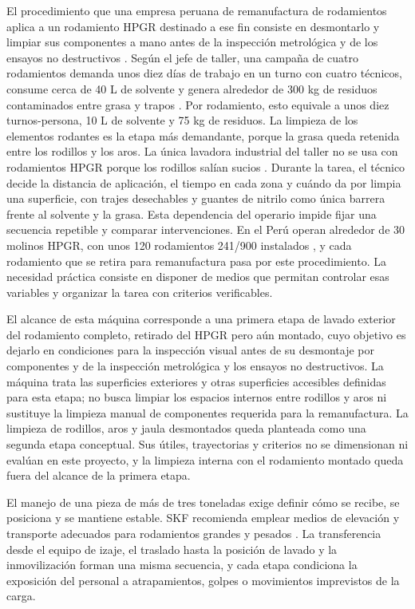 El procedimiento que una empresa peruana de remanufactura de rodamientos aplica a un rodamiento HPGR destinado a ese fin consiste en desmontarlo y limpiar sus componentes a mano antes de la inspección metrológica y de los ensayos no destructivos \cite{taller_jefe_2026}. Según el jefe de taller, una campaña de cuatro rodamientos demanda unos diez días de trabajo en un turno con cuatro técnicos, consume cerca de 40 L de solvente y genera alrededor de 300 kg de residuos contaminados entre grasa y trapos \cite{taller_jefe_2026}. Por rodamiento, esto equivale a unos diez turnos-persona, 10 L de solvente y 75 kg de residuos. La limpieza de los elementos rodantes es la etapa más demandante, porque la grasa queda retenida entre los rodillos y los aros. La única lavadora industrial del taller no se usa con rodamientos HPGR porque los rodillos salían sucios \cite{taller_jefe_2026}. Durante la tarea, el técnico decide la distancia de aplicación, el tiempo en cada zona y cuándo da por limpia una superficie, con trajes desechables y guantes de nitrilo como única barrera frente al solvente y la grasa. Esta dependencia del operario impide fijar una secuencia repetible y comparar intervenciones. En el Perú operan alrededor de 30 molinos HPGR, con unos 120 rodamientos 241/900 instalados \cite{taller_ingeniero_2026}, y cada rodamiento que se retira para remanufactura pasa por este procedimiento. La necesidad práctica consiste en disponer de medios que permitan controlar esas variables y organizar la tarea con criterios verificables.

El alcance de esta máquina corresponde a una primera etapa de lavado exterior del rodamiento completo, retirado del HPGR pero aún montado, cuyo objetivo es dejarlo en condiciones para la inspección visual antes de su desmontaje por componentes y de la inspección metrológica y los ensayos no destructivos. La máquina trata las superficies exteriores y otras superficies accesibles definidas para esta etapa; no busca limpiar los espacios internos entre rodillos y aros ni sustituye la limpieza manual de componentes requerida para la remanufactura. La limpieza de rodillos, aros y jaula desmontados queda planteada como una segunda etapa conceptual. Sus útiles, trayectorias y criterios no se dimensionan ni evalúan en este proyecto, y la limpieza interna con el rodamiento montado queda fuera del alcance de la primera etapa.

El manejo de una pieza de más de tres toneladas exige definir cómo se recibe, se posiciona y se mantiene estable. SKF recomienda emplear medios de elevación y transporte adecuados para rodamientos grandes y pesados \cite{skfmaintenance2011}. La transferencia desde el equipo de izaje, el traslado hasta la posición de lavado y la inmovilización forman una misma secuencia, y cada etapa condiciona la exposición del personal a atrapamientos, golpes o movimientos imprevistos de la carga.

